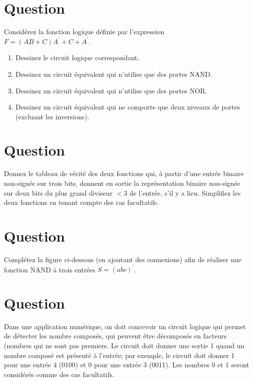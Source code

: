 \documentclass[letter, oneside]{book}
\begin{document}
\section*{Question}
\label{sec:orga0687a2}
Considérez la fonction logique définie par l'expression \(F = (AB + C)
      A^{\prime} + C + A^{\prime}\).

\begin{enumerate}
\item Dessinez le circuit logique correspondant.

\item Dessinez un circuit équivalent qui n'utilise que des portes
NAND.

\item Dessinez un circuit équivalent qui n'utilise que des portes
NOR.

\item Dessinez un circuit équivalent qui ne comporte que deux niveaux de
portes (excluant les inversions).
\end{enumerate}

\section*{Question}
\label{sec:org7a9d174}
Donnez le tableau  de vérité des deux fonctions qui, à partir d'une
  entrée binaire non-signée sur trois bits, donnent en sortie la
  représentation binaire non-signée sur deux bits du plus grand diviseur
  \(< 3\) de l'entrée, s'il y a lieu. Simplifiez les deux fonctions en
  tenant compte des cas facultatifs.

\section*{Question}
\label{sec:org95464c5}
Complétez la figure ci-dessous (en ajoutant des connexions) afin de
  réaliser une  fonction NAND à trois entrées \(S = (a b c)^\prime\).
  \begin{center}

\end{center}

\section*{Question}
\label{sec:org758346f}
Dans une application numérique, on doit concevoir un circuit logique
qui permet de détecter les nombre composés, qui peuvent être
décomposés en facteurs (nombres qui ne sont pas premiers. Le circuit
doit donner une sortie 1 quand un nombre composé est présenté à
l'entrée; par exemple, le circuit doit donner 1 pour une entrée 4
(0100) et 0 pour une entrée 3 (0011). Les nombres 0 et 1 seront
considérés comme des cas facultatifs.
\end{document}
